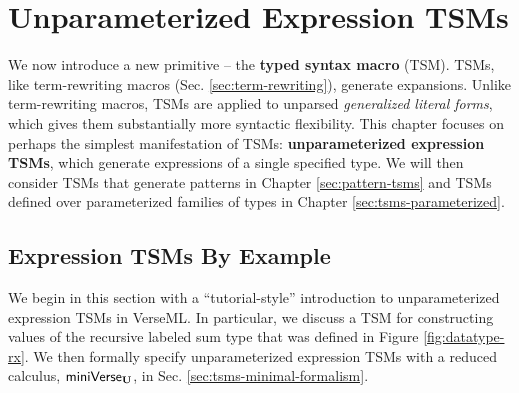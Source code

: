 \chapter{Unparameterized Expression TSMs}\label{chap:tsms}
We now introduce a new primitive -- the \textbf{typed syntax macro} (TSM). TSMs, like term-rewriting macros (Sec. \ref{sec:term-rewriting}), generate expansions. Unlike term-rewriting macros, TSMs are applied to unparsed \emph{generalized literal forms}, which gives them substantially more syntactic flexibility. This chapter focuses on perhaps the simplest manifestation of TSMs: \textbf{unparameterized expression TSMs}, which generate expressions of a single specified type. We will then consider TSMs that generate patterns in Chapter \ref{sec:pattern-tsms} and TSMs defined over parameterized families of types in Chapter \ref{sec:tsms-parameterized}.



\section{Expression TSMs By Example}\label{sec:tsms-by-example}
We begin in this section with a ``tutorial-style'' introduction to unparameterized expression TSMs in VerseML. In particular, we discuss a TSM for constructing values of the recursive labeled sum type  that was defined in Figure \ref{fig:datatype-rx}. We then formally specify unparameterized expression TSMs with a reduced calculus, $\mathsf{miniVerse}_\textbf{U}$, in Sec. \ref{sec:tsms-minimal-formalism}. %


